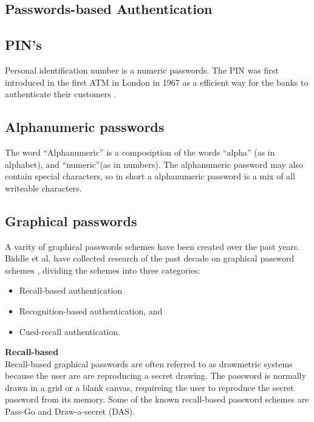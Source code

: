     \subsection{Passwords-based Authentication}

      \subsection*{PIN's}
        Personal identification number is a numeric passwords. The PIN was first introduced in the first ATM in London in 1967 as a efficient way for the banks to authenticate their customers \cite{Bonneau1}.      

      \subsection*{Alphanumeric passwords}

        The word ``Alphanumeric'' is a composiption of the words ``alpha'' (as in alphabet), and ``numeric''(as in numbers). The alphanumeric password may also contain special characters, so in short a alphanumeric password is a mix of all writeable characters.

      \subsection*{Graphical passwords}

      A varity of graphical passwords schemes have been created over the past years. Biddle et al. have collected research of the past decade on graphical password schemes \cite{Biddle}, dividing the schemes into three categories: 

      \begin{itemize}
        \item Recall-based authentication
        \item Recognition-based authentication, and 
        \item Cued-recall authentication.
      \end{itemize}

      {\Large \bf Recall-based} \\
      
      Recall-based graphical passwords are often referred to as drawmetric systems \cite{DeAngeli} because the user are are reproducing a secret drawing. The password is normally drawn in a grid or a blank canvas, requireing the user to reproduce the secret password from its memory. Some of the known recall-based password schemes are Pass-Go and Draw-a-secret (DAS).

